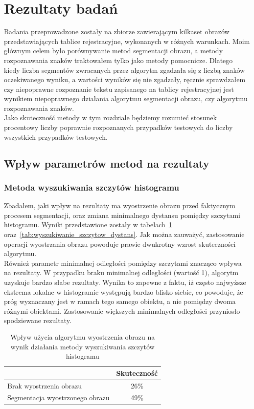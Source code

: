 \section{Rezultaty badań}
Badania przeprowadzone zostały na zbiorze zawierającym kilkaset obrazów przedstawiających tablice rejestracyjne, wykonanych w różnych warunkach. Moim głównym celem było porównywanie metod segmentacji obrazu, a metody rozpoznawania znaków traktowałem tylko jako metody pomocnicze. Dlatego kiedy liczba segmentów zwracanych przez algorytm zgadzała się z liczbą znaków oczekiwanego wyniku, a wartości wyników się nie zgadzały, ręcznie sprawdzałem czy niepoprawne rozpoznanie tekstu zapisanego na tablicy rejestracyjnej jest wynikiem niepoprawnego działania algorytmu segmentacji obrazu, czy algorytmu rozpoznawania znaków. \\
Jako skuteczność metody w tym rozdziale będziemy rozumieć stosunek procentowy liczby poprawnie rozpoznanych przypadków testowych do liczby wszystkich przypadków testowych.

\subsection{Wpływ parametrów metod na rezultaty}
\subsubsection{Metoda wyszukiwania szczytów histogramu}\label{sssec:histogram_peaks_results}
Zbadałem, jaki wpływ na rezultaty ma wyostrzenie obrazu przed faktycznym procesem segmentacji, oraz zmiana minimalnego dystansu pomiędzy szczytami histogramu. Wyniki przedstawione zostały w tabelach~\ref{tab:wyszukiwanie_szczytow_wyostrz} oraz~\ref{tab:wyszukiwanie_szczytow_dystans}. Jak można zauważyć, zastosowanie operacji wyostrzania obrazu powoduje prawie dwukrotny wzrost skuteczności algorytmu. \\
Również parametr minimalnej odległości pomiędzy szczytami znacząco wpływa na rezultaty. W przypadku braku minimalnej odległości (wartość 1), algorytm uzyskuje bardzo słabe rezultaty. Wynika to zapewne z faktu, iż często najwyższe ekstrema lokalne w histogramie występują bardzo blisko siebie, co powoduje, że próg wyznaczany jest w ramach tego samego obiektu, a nie pomiędzy dwoma różnymi obiektami. Zastosowanie większych minimalnych odległości przyniosło spodziewane rezultaty. 

\begin {table}[H]
  \begin{center}
    \begin{tabular}{l | c}
      \space & Skuteczność \\
      \hline
      Brak wyostrzenia obrazu & 26\% \\
      Segmentacja wyostrzonego obrazu & 49\%
    \end{tabular}
    \caption {Wpływ użycia algorytmu wyostrzenia obrazu na wynik działania metody wyszukiwania szczytów histogramu}
    \label{tab:wyszukiwanie_szczytow_wyostrz} 
  \end{center}
\end {table}


